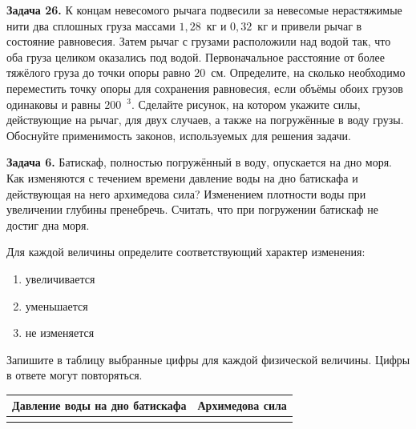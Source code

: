 
\begin{taskbasic}[code={\label{task:fluid_v06_n26}}]
\textbf{Задача 26.} К концам невесомого рычага подвесили за невесомые нерастяжимые нити два сплошных груза массами $1{,}28$~кг и $0{,}32$~кг и привели рычаг в состояние равновесия. Затем рычаг с грузами расположили над водой так, что оба груза целиком оказались под водой. Первоначальное расстояние от более тяжёлого груза до точки опоры равно $20$~см. Определите, на сколько необходимо переместить точку опоры для сохранения равновесия, если объёмы обоих грузов одинаковы и равны $200$~$^3$. Сделайте рисунок, на котором укажите силы, действующие на рычаг, для двух случаев, а также на погружённые в воду грузы. Обоснуйте применимость законов, используемых для решения задачи.

\end{taskbasic}

\begin{taskbasic}[code={\label{task:fluid_v07_n06}}]
\textbf{Задача 6.} Батискаф, полностью погружённый в воду, опускается на дно моря. Как изменяются с течением времени давление воды на дно батискафа и действующая на него архимедова сила? Изменением плотности воды при увеличении глубины пренебречь. Считать, что при погружении батискаф не достиг дна моря.

Для каждой величины определите соответствующий характер изменения:
\begin{enumerate}
    \item увеличивается
    \item уменьшается
    \item не изменяется
\end{enumerate}

Запишите в таблицу выбранные цифры для каждой физической величины. Цифры в ответе могут повторяться.

\begin{center}
\begin{tabular}{|c|c|}
\hline
Давление воды на дно батискафа & Архимедова сила \\ \hline
& \\ \hline
\end{tabular}
\end{center}

\end{taskbasic}

